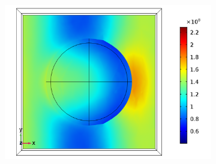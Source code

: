\begin{figure}[htb!]
\begin{subfigure}{0.32\textwidth}
        \includegraphics[width=\linewidth]{figures/ch4/S5A/FieldDistribution/Sample5A_TM_Slice@z=-05t_wl=330_notitle.png}
   \end{subfigure}
   

\end{figure}
